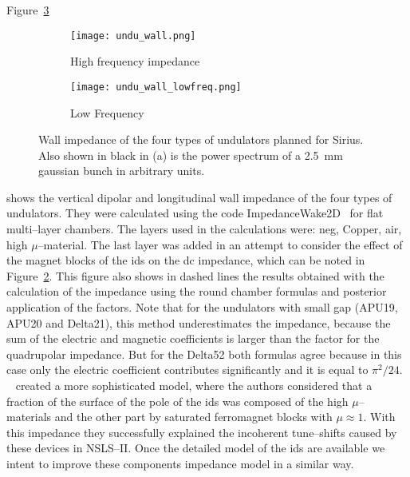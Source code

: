     Figure~\ref{fig:undu_wall}
    \begin{figure}
        \centering
        \begin{subfigure}[c]{0.65\textwidth}
            \centering
            \texttt{[image: undu\_wall.png]}
            \caption{High frequency impedance}
            \label{fig:undu_wall_highfreq}
        \end{subfigure}
        \begin{subfigure}[c]{0.34\textwidth}
            \centering
            \texttt{[image: undu\_wall\_lowfreq.png]}
            \caption{Low Frequency}
            \label{fig:undu_wall_lowfreq}
        \end{subfigure}
        \caption{Wall impedance of the four types of undulators planned for Sirius. Also shown in black in (a) is the power spectrum of a \SI{2.5}{\milli\meter} gaussian bunch in arbitrary units.}
        \label{fig:undu_wall}
    \end{figure}
    shows the vertical dipolar and longitudinal wall impedance of the four types of undulators. They were calculated using the code ImpedanceWake2D~\cite{Mounet2011} for flat multi--layer chambers. The layers used in the calculations were: \gls{neg}, Copper, air, high $\mu$--material. The last layer was added in an attempt to consider the effect of the magnet blocks of the \glspl{id} on the \gls{dc} impedance, which can be noted in Figure~\ref{fig:undu_wall_lowfreq}. This figure also shows in dashed lines the results obtained with the calculation of the impedance using the round chamber formulas and posterior application of the  factors. Note that for the undulators with small gap (APU19, APU20 and Delta21), this method underestimates the impedance, because the sum of the electric and magnetic  coefficients is larger than the factor for the quadrupolar impedance. But for the Delta52 both formulas agree because in this case only the electric coefficient contributes significantly and it is equal to $\pi^2/24$.
    ~ created a more sophisticated model, where the authors considered that a fraction of the surface of the pole of the \glspl{id} was composed of the high $\mu$--materials and the other part by saturated ferromagnet blocks with $\mu\approx1$. With this impedance they successfully explained the incoherent tune--shifts caused by these devices in NSLS--II. Once the detailed model of the \glspl{id} are available we intent to improve these components impedance model in a similar way.


